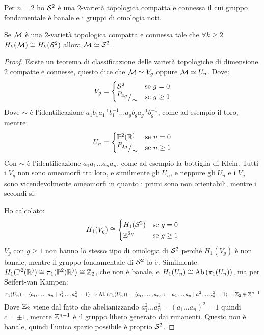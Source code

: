 Per $ n = 2 $ ho $ \mathcal{S}^{2} $ è una $ 2 $-varietà topologica compatta e connessa
il cui gruppo fondamentale è banale e i gruppi di omologia noti.

\begin{proposition}
  Se $ \mathcal{M} $ è una $ 2 $-varietà topologica compatta e connessa tale che $ \forall k \geq 2 $
  $ H_k(\mathcal{M}) \cong H_k(\mathcal{S}^{2}) $ allora $ \mathcal{M} \simeq \mathcal{S}^{2} $.
\end{proposition}
\begin{proof}
  Esiste un teorema di classificazione delle varietà topologiche di dimensione $ 2 $
  compatte e connesse, questo dice che $ \mathcal{M} \simeq V_g $ oppure $ \mathcal{M} \simeq U_n $.
  Dove:
  \[
    V_g =
    \begin{cases}
      \mathcal{S}^{2} & \text{se } g = 0 \\
      {^{\textstyle P_{4g}}\big/_{\textstyle \sim}} & \text{se } g \geq 1
    \end{cases}
  \]
  Dove $ \sim $ è l'identificazione $ a_1 b_1 a_1^{-1}b_1^{-1}\dots a_g b_g a_g^{-1}b_g^{-1} $,
  come ad esempio il toro, mentre:
  \[
    U_n =
    \begin{cases}
      \mathbb{P}^2(\mathbb{R}^) & \text{se } n = 0 \\
      {^{\textstyle P_{2g}}\big/_{\textstyle \sim}} & \text{se } n \geq 1
    \end{cases}
  \]
  Con $ \sim $ è l'identificazione $ a_1 a_1 \dots a_n a_n $, come ad esempio
  la bottiglia di Klein.
  Tutti i $ V_g $ non sono omeomorfi tra loro, e similmente gli $ U_n $, e neppure
  gli $ U_n $ e i $ V_g $ sono vicendevolmente omeomorfi in quanto i primi sono
  non orientabili, mentre i secondi si.

  Ho calcolato:
  \[
    H_1(V_g) \cong
    \begin{cases}
      H_1(\mathcal{S}^{2}) & \text{se } g = 0 \\
      \mathbb{Z}^{2g} & \text{se } g \geq 1
    \end{cases}
  \]
  $ V_g $ con $ g \geq 1 $ non hanno lo stesso tipo di omologia di $ \mathcal{S}^{2} $ perché
  $ H_1(V_g) $ è non banale, mentre il gruppo fondamentale di $ \mathcal{S}^{2} $ lo è.
  Similmente $ H_1(\mathbb{P}^2(\mathbb{R}^)) \cong \pi_1(\mathbb{P}^2(\mathbb{R}^)) \cong \mathbb{Z}_2 $, che non è
  banale, e $ H_1(U_n) \cong \mathrm{Ab}\left( \pi_1(U_n) \right) $, ma per Seifert-van Kampen:
  \[
    \pi_1(U_n) = \langle a_t, \dots, a_n \; | \; a_1^2\dots a_n^2 = 1 \rangle \Rightarrow \mathrm{Ab}\left( \pi_1(U_n) \right) = \langle a_t, \dots, a_n, c = a_1 \dots a_n \; | \; a_1^2\dots a_n^2 = 1 \rangle =
    \mathbb{Z}_2 \oplus \mathbb{Z}^{n-1}
  \]
  Dove $ \mathbb{Z}_2 $ viene dal fatto che abelianizzando $ a_1^2\dots a_n^2 = (a_1 \dots a_n)^2 = 1 $ quindi
  $ c = \pm 1 $, mentre $ \mathbb{Z}^{n-1} $ è il gruppo libero generato dai rimanenti.
  Questo non è banale, quindi l'unico spazio possibile è proprio $ \mathcal{S}^{2} $.
\end{proof}

